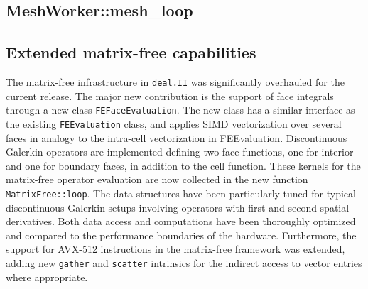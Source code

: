 \documentclass{ansarticle-preprint}
\newcommand{\specialword}[1]{\texttt{#1}}
\newcommand{\dealii}{{\specialword{deal.II}}\xspace}
\begin{document}
\subsection{MeshWorker::mesh\_loop}


\subsection{Extended matrix-free capabilities}

The matrix-free infrastructure in \dealii{} was significantly overhauled for
the current release. The major new contribution is the support of face
integrals through a new class \texttt{FEFaceEvaluation}. The new class has a
similar interface as the existing \texttt{FEEvaluation} class, and applies SIMD
vectorization over several faces in analogy to the intra-cell vectorization in
FEEvaluation. Discontinuous Galerkin operators are implemented defining two
face functions, one for interior and one for boundary faces, in addition to
the cell function. These kernels for the matrix-free operator evaluation are
now collected in the new function \texttt{MatrixFree::loop}. The data
structures have been particularly tuned for typical discontinuous Galerkin
setups involving operators with first and second spatial derivatives. Both
data access and computations have been thoroughly optimized and compared to
the performance boundaries of the hardware. Furthermore, the support for
AVX-512 instructions in the matrix-free framework was extended, adding new
\texttt{gather} and \texttt{scatter} intrinsics for the indirect access to
vector entries where appropriate.
\end{document}
